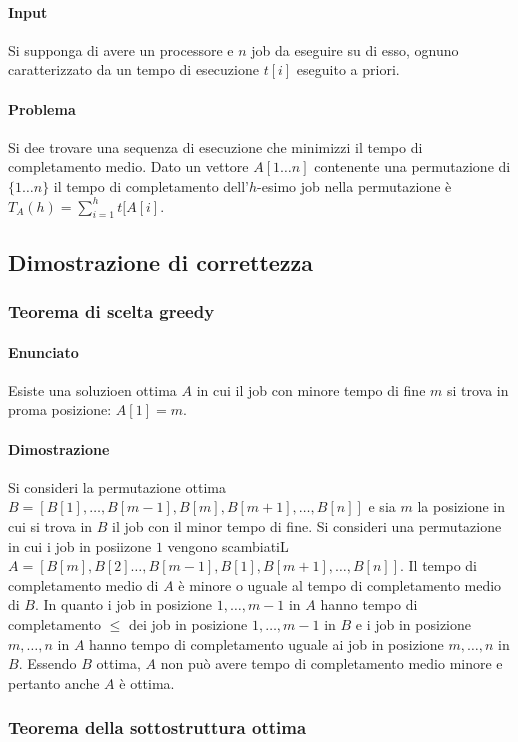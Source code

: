 \paragraph{Input}
Si supponga di avere un processore e $n$ job da eseguire su di esso, ognuno caratterizzato da un tempo di esecuzione $t[i]$ eseguito a priori.
\paragraph{Problema}
Si dee trovare una sequenza di esecuzione che minimizzi il tempo di completamento medio. Dato un vettore $A[1\dots n]$ contenente una permutazione di $\{1\dots n\}$ il tempo di 
completamento dell'$h$-esimo job nella permutazione \`e $T_A(h) = \sum\limits_{i = 1}^h t[A[i]$. 
\subsection{Dimostrazione di correttezza}
\subsubsection{Teorema di scelta greedy}
\paragraph{Enunciato}
Esiste una soluzioen ottima $A$ in cui il job con minore tempo di fine $m$ si trova in proma posizione: $A[1] = m$.
\paragraph{Dimostrazione}
Si consideri la permutazione ottima $B = [B[1], \dots, B[m-1], B[m], B[m+1], \dots, B[n]]$ e sia $m$ la posizione in cui si trova in $B$ il job con il minor tempo di fine. Si consideri
una permutazione in cui i job in posiizone $1$ vengono scambiatiL $A =[B[m], B[2] \dots, B[m-1], B[1], B[m+1], \dots, B[n]]$. Il tempo di completamento medio di $A$ \`e minore o uguale
al tempo di completamento medio di $B$. In quanto i job in posizione $1, \dots, m-1$ in $A$ hanno tempo di completamento $\le$ dei job in posizione $1, \dots, m-1$ in $B$ e i job in
posizione $m, \dots, n$ in $A$ hanno tempo di completamento uguale ai job in posizione $m, \dots, n$ in $B$. Essendo $B$ ottima, $A$ non pu\`o avere tempo di completamento medio minore
e pertanto anche $A$ \`e ottima. 
\subsubsection{Teorema della sottostruttura ottima}
